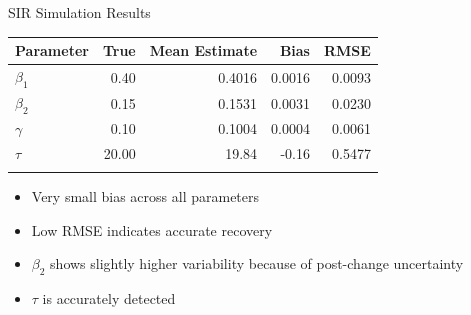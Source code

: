 \documentclass[
  ignorenonframetext,
  aspectratio=169,
]{beamer}
\providecommand{\tightlist}{%
  \setlength{\itemsep}{0pt}\setlength{\parskip}{0pt}}\usepackage{longtable,booktabs,array}
\begin{document}
\begin{frame}{SIR Simulation Results}
\label{sir-simulation-results}
\begin{longtable}[]{@{}lrrrr@{}}
\toprule\noalign{}
Parameter & True & Mean Estimate & Bias & RMSE \\
\midrule\noalign{}
\endhead
\(\beta_1\) & 0.40 & 0.4016 & 0.0016 & 0.0093 \\
\(\beta_2\) & 0.15 & 0.1531 & 0.0031 & 0.0230 \\
\(\gamma\) & 0.10 & 0.1004 & 0.0004 & 0.0061 \\
\(\tau\) & 20.00 & 19.84 & -0.16 & 0.5477 \\
\bottomrule\noalign{}
\end{longtable}

\begin{itemize}
\tightlist
\item
  Very small bias across all parameters
\item
  Low RMSE indicates accurate recovery
\item
  \(\beta_2\) shows slightly higher variability because of post-change
  uncertainty
\item
  \(\tau\) is accurately detected
\end{itemize}
\end{frame}
\end{document}
